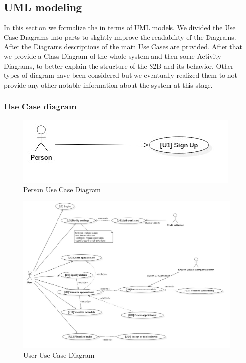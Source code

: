 \subsection{UML modeling}
	In this section we formalize the  in terms of UML models.\newline
	We divided the Use Case Diagrams into parts to slightly improve the readability of the Diagrams. After the Diagrams descriptions of the main Use Cases are provided.\newline
	After that we provide a Class Diagram of the whole system and then some Activity Diagrams, to better explain the structure of the S2B and its behavior.\newline
	Other types of diagram have been considered but we eventually realized them to not provide any other notable information about the system at this stage.
	\subsubsection{Use Case diagram}
		\smallskip
		\begin{figure}[H]	
			\centerline{\includegraphics[scale= 0.7]{Images/UseCaseDiagram0}}
			\caption{Person Use Case Diagram}
		\end{figure}
		\begin{figure}[H]	
			\centerline{\includegraphics[width=\paperwidth-1]{Images/UseCaseDiagram1}}
			\caption{User Use Case Diagram}
		\end{figure}

